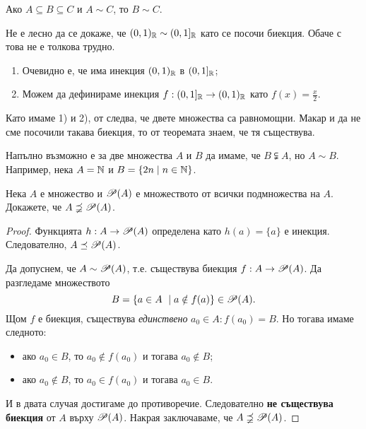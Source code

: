 \begin{cor}
  Ако $A \subseteq B \subseteq C$ и $A \sim C$, то $B \sim C$.
\end{cor}

\begin{example}
  Не е лесно да се докаже, че $(0,1)_{\mathbb{R}} \sim (0,1]_{\mathbb{R}}$ като се посочи биекция.
  Обаче с  това не е толкова трудно.
  \begin{enumerate}[1)]
  \item 
    Очевидно е, че има инекция $(0,1)_{\mathbb{R}}$ в $(0,1]_{\mathbb{R}}$;
  \item
    Можем да дефинираме инекция $f:(0,1]_{\mathbb{R}} \to (0,1)_{\mathbb{R}}$
    като $f(x) = \frac{x}{2}$.    
  \end{enumerate}
  Като имаме 1) и 2), от  следва, че двете множества са равномощни.
  Макар и да не сме посочили такава биекция, то от теоремата знаем, че тя съществува.  
\end{example}


\begin{framed}
\begin{remark}
  Напълно възможно е за две множества $A$ и $B$ да имаме, че  $B \subsetneqq A$, но $A \sim B$.
  Например, нека $A = \mathbb{N}$ и $B = \{2n\mid n\in\mathbb{N}\}$.
\end{remark}
\end{framed}

\begin{thm}
  Нека $A$ е множество и $\mathscr{P}(A)$ е множеството от всички подмножества на $A$.
  Докажете, че $A \precneqq \mathscr{P}(A)$.
\end{thm}
\begin{proof}
  Функцията $h:A \to \mathscr{P}(A)$ определена като $h(a) = \{a\}$ е инекция.
  Следователно, $A \preceq \mathscr{P}(A)$.

  Да допуснем, че $A \sim \mathscr{P}(A)$, т.е. 
  съществува биекция $f:A\rightarrow \mathscr{P}(A)$.
  Да разгледаме множеството \[B=\{a\in A\ \mid a\notin f(a)\}\in\mathscr{P}(A).\]
  Щом $f$ е биекция, съществува {\em единствено} $a_0\in A: f(a_0) = B$.
  Но тогава имаме следното:
  \begin{itemize}
  \item
    ако $a_0\in B$, то $a_0 \not\in f(a_0)$ и тогава $a_0\not\in B$;
  \item
    ако $a_0\not\in B$, то $a_0 \in f(a_0)$ и тогава $a_0\in B$.
  \end{itemize}
  И в двата случая достигаме до противоречие.
  Следователно {\bf не съществува биекция} от $A$ върху $\mathscr{P}(A)$.
  Накрая заключаваме, че $A \precneqq \mathscr{P}(A)$.
\end{proof}


